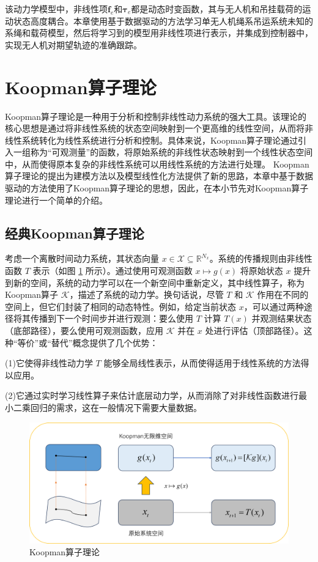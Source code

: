 \documentclass[lang=chs, degree=master, blindreview=false, winfonts=true]{yanputhesis}
\begin{document}
该动力学模型中，非线性项$\bm f_e$和$\bm \tau_e$都是动态时变函数，其与无人机和吊挂载荷的运动状态高度耦合。本章使用基于数据驱动的方法学习单无人机绳系吊运系统未知的系绳和载荷模型，然后将学习到的模型用非线性项进行表示，并集成到控制器中，实现无人机对期望轨迹的准确跟踪。 




\section{Koopman算子理论}

Koopman算子理论是一种用于分析和控制非线性动力系统的强大工具。该理论的核心思想是通过将非线性系统的状态空间映射到一个更高维的线性空间，从而将非线性系统转化为线性系统进行分析和控制。具体来说，Koopman算子理论通过引入一组称为“可观测量”的函数，将原始系统的非线性状态映射到一个线性状态空间中，从而使得原本复杂的非线性系统可以用线性系统的方法进行处理。
Koopman算子理论的提出为建模方法以及模型线性化方法提供了新的思路，本章中基于数据驱动的方法使用了Koopman算子理论的思想，因此，在本小节先对Koopman算子理论进行一个简单的介绍。

\subsection{经典Koopman算子理论}

考虑一个离散时间动力系统，其状态向量 \( x \in \mathcal{X} \subseteq \mathbb{R}^{N_x} \)。系统的传播规则由非线性函数 \( T \) 表示（如图 \ref{3_1} 所示）。通过使用可观测函数 \( x \mapsto g(x) \) 将原始状态 \( x \) 提升到新的空间，系统的动力学可以在一个新空间中重新定义，其中线性算子，称为Koopman算子 \( \mathcal{K} \)，描述了系统的动力学。换句话说，尽管 \( T \) 和 \( \mathcal{K} \) 作用在不同的空间上，但它们封装了相同的动态特性。例如，给定当前状态 \( x \)，可以通过两种途径将其传播到下一个时间步并进行观测：要么使用 \( T \) 计算 \( T(x) \) 并观测结果状态（底部路径），要么使用可观测函数，应用 \( \mathcal{K} \) 并在 \( x \) 处进行评估（顶部路径）。这种“等价”或“替代”概念提供了几个优势：

(1)它使得非线性动力学 \( T \) 能够全局线性表示，从而使得适用于线性系统的方法得以应用。

(2)它通过实时学习线性算子来估计底层动力学，从而消除了对非线性函数进行最小二乘回归的需求，这在一般情况下需要大量数据。
\begin{figure}[hbt!]
	\centering
	\includegraphics[width=34pc]{picture/3_1.png} 
	\caption{Koopman算子理论} \label{3_1}
\end{figure}
\end{document}

